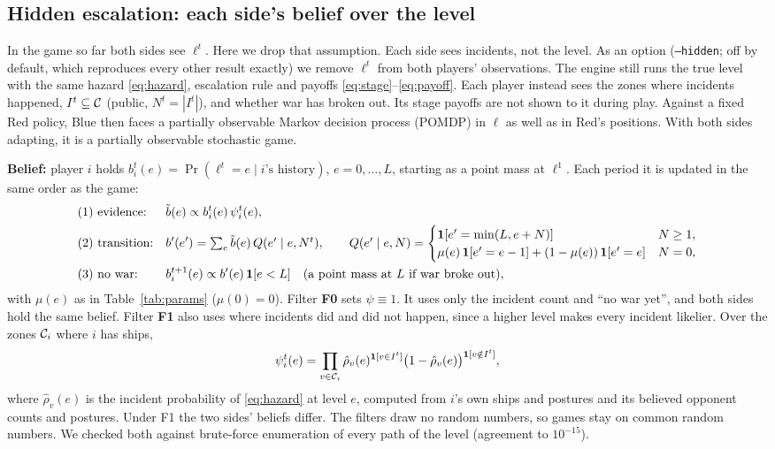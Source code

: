 \begin{addblock}
\subsection{Hidden escalation: each side's belief over the level}\label{sec:hidden}
In the game so far both sides see $\ell^t$. Here we drop that assumption. Each side
sees incidents, not the level. As an option (\texttt{--hidden}; off by default, which reproduces every other
result exactly) we remove $\ell^t$ from both players' observations. The engine still runs the true level with the same
hazard \eqref{eq:hazard}, escalation rule and payoffs \eqref{eq:stage}--\eqref{eq:payoff}. Each player instead sees the
zones where incidents happened, $I^t\subseteq\mathcal{C}$ (public, $N^t=|I^t|$), and whether war has broken out. Its stage
payoffs are not shown to it during play. Against a fixed Red policy, Blue then faces a partially observable Markov
decision process (POMDP) in $\ell$ as well as in Red's positions. With both sides adapting, it is a partially
observable stochastic game.

\textbf{Belief:} player $i$ holds $b^t_i(e)=\Pr(\ell^t=e\mid\text{$i$'s history})$, $e=0,\dots,L$, starting as a point
mass at $\ell^1$. Each period it is updated in the same order as the game:
\begin{align*}
&\text{(1) evidence:} && \tilde b(e)\propto b^t_i(e)\,\psi^t_i(e),\\
&\text{(2) transition:} && b'(e')=\textstyle\sum_e\tilde b(e)\,Q(e'\mid e,N^t),\qquad
Q(e'\mid e,N)=\begin{cases}\mathbf{1}[e'=\min(L,e+N)] & N\ge1,\\ \mu(e)\,\mathbf{1}[e'=e-1]+(1-\mu(e))\,\mathbf{1}[e'=e] & N=0,\end{cases}\\
&\text{(3) no war:} && b^{t+1}_i(e)\propto b'(e)\,\mathbf{1}[e<L]\quad\text{(a point mass at $L$ if war broke out)},
\end{align*}
with $\mu(e)$ as in Table~\ref{tab:params} ($\mu(0)=0$). Filter \textbf{F0} sets $\psi\equiv1$. It uses only the
incident count and ``no war yet'', and both sides hold the same belief. Filter \textbf{F1} also uses where incidents did
and did not happen, since a higher level makes every incident likelier. Over the zones $\mathcal{C}_i$ where $i$ has ships,
\[
\psi^t_i(e)=\prod_{v\in\mathcal{C}_i}\hat\rho_v(e)^{\mathbf{1}[v\in I^t]}\big(1-\hat\rho_v(e)\big)^{\mathbf{1}[v\notin I^t]},
\]
where $\hat\rho_v(e)$ is the incident probability of \eqref{eq:hazard} at level $e$, computed from $i$'s own ships and
postures and its believed opponent counts and postures. Under F1 the two sides' beliefs differ. The filters draw no
random numbers, so games stay on common random numbers. We checked both against brute-force enumeration of every
path of the level (agreement to $10^{-15}$).


\end{addblock}
